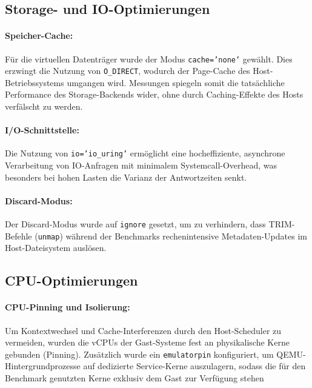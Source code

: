 \begin{sloppypar}
\subsection{Storage- und \acs{IO}-Optimierungen}

\paragraph{Speicher-Cache:}
Für die virtuellen Datenträger wurde der Modus \texttt{cache='none'} gewählt.
Dies erzwingt die Nutzung von \texttt{O\_DIRECT}, wodurch der Page-Cache des Host-Betriebssystems umgangen wird.
Messungen spiegeln somit die tatsächliche Performance des Storage-Backends wider,
ohne durch Caching-Effekte des Hosts verfälscht zu werden. \cite{9:SUSE, 10:Ban}

\paragraph{I/O-Schnittstelle:}
Die Nutzung von \texttt{io='io\_uring'} ermöglicht eine hocheffiziente, asynchrone Verarbeitung
von \acs{IO}-Anfragen mit minimalem Systemcall-Overhead,
was besonders bei hohen Lasten die Varianz der Antwortzeiten senkt. \cite{10:Ban}

\paragraph{Discard-Modus:}
Der Discard-Modus wurde auf \texttt{ignore} gesetzt, um zu verhindern,
dass TRIM-Befehle (\texttt{unmap}) während der Benchmarks
rechenintensive Metadaten-Updates im Host-Dateisystem auslösen. \cite{12:qemu.readthedocs}

\subsection{\acs{CPU}-Optimierungen}

\paragraph{CPU-Pinning und Isolierung:}
Um Kontextwechsel und Cache-Interferenzen durch den Host-Scheduler zu vermeiden,
wurden die \acs{vCPU}s der Gast-Systeme fest an physikalische Kerne gebunden (Pinning).
Zusätzlich wurde ein \texttt{emulatorpin} konfiguriert,
um \acs{QEMU}-Hintergrundprozesse auf dedizierte Service-Kerne auszulagern,
sodass die für den Benchmark genutzten Kerne exklusiv dem Gast zur Verfügung stehen \cite{13:Dohost}


\end{sloppypar}
